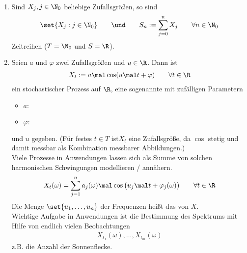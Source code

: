 \begin{beispiel}\label{beisp1.3.3}\
	\begin{enumerate}[label=(\alph*)]
		\item Sind $X_j,j\in\N_0$ beliebige Zufallsgrößen, so sind 
		\begin{align*}
			\set{X_j:j\in\N_0}
			\qquad\und\qquad
			S_n:=\sum\limits_{j=0}^n X_j\qquad\forall n\in\N_0
		\end{align*}
		Zeitreihen ($T=\N_0$ und $S=\R$).
		\item Seien $a$ und $\varphi$ zwei Zufallsgrößen und $u\in\R$.
		Dann ist 
		\begin{align*}
			X_t:=a\mal\cos(u\mal t+\varphi)\qquad\forall t\in\R
		\end{align*}
		ein stochastischer Prozess auf $\R$, eine sogenannte  mit zufälligen Parametern
		\begin{itemize}
			\item $a$: 
			\item $\varphi$: 
		\end{itemize}
		und  $u$ gegeben.
		(Für festes $t\in T$ ist$X_t$ eine Zufallsgröße, da $\cos$ stetig und damit messbar als Kombination messbarer Abbildungen.)\\
		Viele Prozesse in Anwendungen lassen sich als Summe von solchen harmonischen Schwingungen modellieren / annähern.
		\begin{align*}
			X_t(\omega)=\sum\limits_{j=1}^n a_j(\omega)\mal\cos\big(u_j\mal t+\varphi_j(\omega)\big)\qquad\forall t\in\R
		\end{align*}
		Die Menge $\set{u_1,\ldots,u_n}$ der Frequenzen heißt das  von $X$. \\
		Wichtige Aufgabe in Anwendungen ist die Bestimmung des Spektrums mit Hilfe von endlich vielen Beobachtungen 
		\begin{align*}
			X_{t_1}(\omega),\ldots,X_{t_m}(\omega)
		\end{align*}
		z.B. die Anzahl der Sonnenflecke.
	\end{enumerate}
\end{beispiel}




